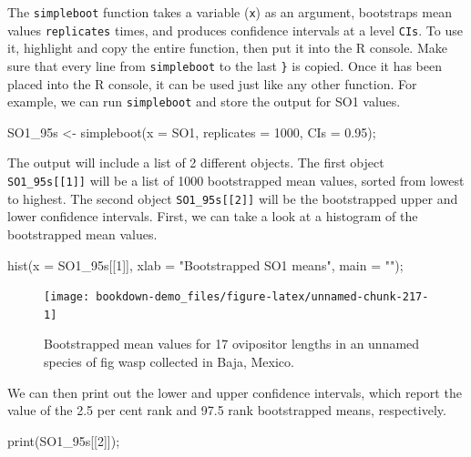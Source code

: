 \documentclass[
]{scrbook}
\newenvironment{Shaded}{\begin{snugshade}}{\end{snugshade}}
\newcommand{\AttributeTok}[1]{\textcolor[rgb]{0.77,0.63,0.00}{#1}}
\newcommand{\DecValTok}[1]{\textcolor[rgb]{0.00,0.00,0.81}{#1}}
\newcommand{\FloatTok}[1]{\textcolor[rgb]{0.00,0.00,0.81}{#1}}
\newcommand{\FunctionTok}[1]{\textcolor[rgb]{0.00,0.00,0.00}{#1}}
\newcommand{\NormalTok}[1]{#1}
\newcommand{\OtherTok}[1]{\textcolor[rgb]{0.56,0.35,0.01}{#1}}
\newcommand{\StringTok}[1]{\textcolor[rgb]{0.31,0.60,0.02}{#1}}
\begin{document}
The \texttt{simpleboot} function takes a variable (\texttt{x}) as an argument, bootstraps mean values \texttt{replicates} times, and produces confidence intervals at a level \texttt{CIs}.
To use it, highlight and copy the entire function, then put it into the R console.
Make sure that every line from \texttt{simpleboot} to the last \texttt{\}} is copied.
Once it has been placed into the R console, it can be used just like any other function.
For example, we can run \texttt{simpleboot} and store the output for SO1 values.

\begin{Shaded}
\begin{Highlighting}[]
\NormalTok{SO1\_95s }\OtherTok{\textless{}{-}} \FunctionTok{simpleboot}\NormalTok{(}\AttributeTok{x =}\NormalTok{ SO1, }\AttributeTok{replicates =} \DecValTok{1000}\NormalTok{, }\AttributeTok{CIs =} \FloatTok{0.95}\NormalTok{);}
\end{Highlighting}
\end{Shaded}

The output will include a list of 2 different objects.
The first object \texttt{SO1\_95s{[}{[}1{]}{]}} will be a list of 1000 bootstrapped mean values, sorted from lowest to highest.
The second object \texttt{SO1\_95s{[}{[}2{]}{]}} will be the bootstrapped upper and lower confidence intervals.
First, we can take a look at a histogram of the bootstrapped mean values.

\begin{Shaded}
\begin{Highlighting}[]
\FunctionTok{hist}\NormalTok{(}\AttributeTok{x =}\NormalTok{ SO1\_95s[[}\DecValTok{1}\NormalTok{]], }\AttributeTok{xlab =} \StringTok{"Bootstrapped SO1 means"}\NormalTok{, }\AttributeTok{main =} \StringTok{""}\NormalTok{);}
\end{Highlighting}
\end{Shaded}

\begin{figure}
\texttt{[image: bookdown-demo\_files/figure-latex/unnamed-chunk-217-1]} \caption{Bootstrapped mean values for 17 ovipositor lengths in an unnamed species of fig wasp collected in Baja, Mexico.}\label{fig:unnamed-chunk-217}
\end{figure}

We can then print out the lower and upper confidence intervals, which report the value of the 2.5 per cent rank and 97.5 rank bootstrapped means, respectively.

\begin{Shaded}
\begin{Highlighting}[]
\FunctionTok{print}\NormalTok{(SO1\_95s[[}\DecValTok{2}\NormalTok{]]);}
\end{Highlighting}
\end{Shaded}
\end{document}
